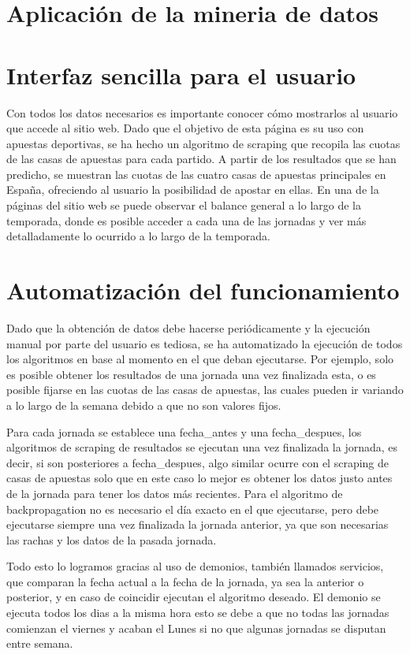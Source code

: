 \section{Aplicación de la mineria de datos}

\section{Interfaz sencilla para el usuario}

Con todos los datos necesarios es importante conocer cómo mostrarlos al usuario que accede al sitio web. Dado que el objetivo de esta página es su uso con apuestas deportivas, se ha hecho un algoritmo de scraping que recopila las cuotas de las casas de apuestas para cada partido.
A partir de los resultados que se han predicho, se muestran las cuotas de las cuatro casas de apuestas principales en España, ofreciendo al usuario la posibilidad de apostar en ellas.
En una de la páginas del sitio web se puede observar el balance general a lo largo de la temporada, donde es posible acceder a cada una de las jornadas y ver más detalladamente lo ocurrido a lo largo de la temporada.

\section{Automatización del funcionamiento}

Dado que la obtención de datos debe hacerse periódicamente y la ejecución manual por parte del usuario es tediosa, se ha automatizado la ejecución de todos los algoritmos en base al momento en el que deban ejecutarse. Por ejemplo, solo es posible obtener los resultados de una jornada una vez finalizada esta, o es posible fijarse en las cuotas de las casas de apuestas, las cuales pueden ir variando a lo largo de la semana debido a que no son valores fijos.

Para cada jornada se establece una fecha\_antes y una fecha\_despues, los algoritmos de scraping de resultados se ejecutan una vez finalizada la jornada, es decir, si son posteriores a fecha\_despues, algo similar ocurre con el scraping de casas de apuestas solo que en este caso lo mejor es obtener los datos justo antes de la jornada para tener los datos más recientes. Para el algoritmo de backpropagation no es necesario el día exacto en el que ejecutarse, pero debe ejecutarse siempre una vez finalizada la jornada anterior, ya que son necesarias las rachas y los datos de la pasada jornada.

Todo esto lo logramos gracias al uso de demonios, también llamados servicios, que comparan la fecha actual a la fecha de la jornada, ya sea la anterior o posterior, y en caso de coincidir ejecutan el algoritmo deseado. El demonio se ejecuta todos los dias a la misma hora esto se debe a que no todas las jornadas comienzan el viernes y acaban el Lunes si no que algunas jornadas se disputan entre semana.